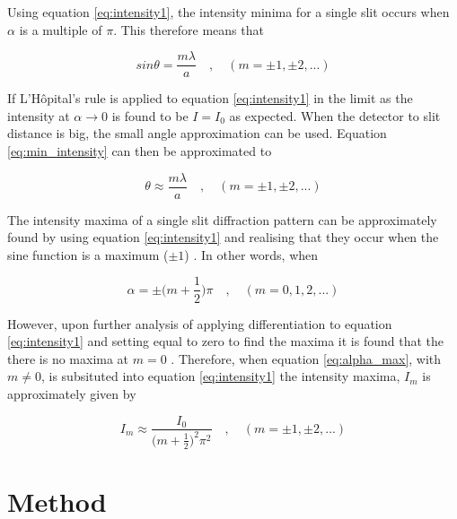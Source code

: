 \documentclass{article}
\begin{document}
\vspace{2mm}
\noindent
Using equation \eqref{eq:intensity1}, the intensity minima for a single slit occurs when $\alpha$ is a multiple of $\pi$. This therefore means that

\begin{equation}
\label{eq:min_intensity}
sin{\theta} = \frac{m \lambda}{a} \quad,\quad(m = \pm1, \pm2, ...)
\end{equation}

\vspace{2mm}
\noindent
If L'H{\^o}pital's rule \cite{Book01} is applied to equation \eqref{eq:intensity1} in the limit as the intensity at $\alpha \rightarrow 0$ is found to be $I = I_0$ as expected. When the detector to slit distance is big, the small angle approximation can be used. Equation \eqref{eq:min_intensity} can then be approximated to

\begin{equation}
\label{eq:small_angle}
\theta \approx \frac{m\lambda}{a} \quad,\quad(m = \pm1, \pm2, ...)
\end{equation}


\vspace{2mm}
\noindent
The intensity maxima of a single slit diffraction pattern can be approximately found by using equation \eqref{eq:intensity1} and realising that they occur when the sine function is a maximum ($\pm 1$) \cite{Book01}. In other words, when

\begin{equation}
\label{eq:alpha_max}
\alpha = \pm\bigg(m + \frac{1}{2}\bigg)\pi \quad,\quad(m = 0, 1, 2, ...)
\end{equation}

\vspace{2mm}
\noindent
However, upon further analysis of applying differentiation to equation \eqref{eq:intensity1} and setting equal to zero to find the maxima it is found that the there is no maxima at $m = 0$ \cite{Book01}. Therefore, when equation \eqref{eq:alpha_max}, with $m \neq 0$, is subsituted into equation \eqref{eq:intensity1} the intensity maxima, $I_m$ is approximately given by \cite{Book01}

\vspace{2mm}
\noindent
\begin{equation}
\label{eq:max_intensity}
I_m \approx \frac{I_0}{\big(m + \frac{1}{2}\big)^2\pi^2} \quad,\quad(m =  \pm1, \pm2, ...)
\end{equation}


\section{Method}
\label{sec:method}
\end{document}
